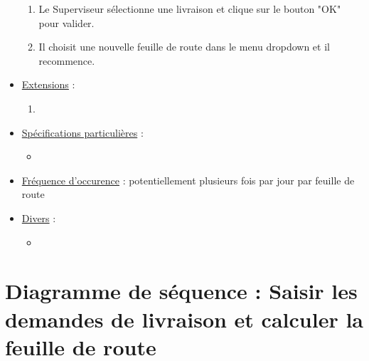 \documentclass[a4paper]{report}
\begin{document}
\begin{itemize}[label = \textbullet, font = \color{orange}]
\begin{enumerate}
        \item Le Superviseur sélectionne une livraison et clique sur le bouton "OK" pour valider.
        \item Il choisit une nouvelle feuille de route dans le menu dropdown et il recommence.
    \end{enumerate}
\item \underline{Extensions} :
	\begin{enumerate}
    	\item
    \end{enumerate}
\item \underline{Spécifications particulières} :
	\begin{itemize}[label = \textbullet, font = \color{blue}]
    \item
    \end{itemize}
\item \underline{Fréquence d'occurence} : potentiellement plusieurs fois par jour par feuille de route
\item \underline{Divers} :
\begin{itemize}[label = \textbullet, font = \color{blue}]
    \item
    \end{itemize}
\end{itemize}



\pagebreak

\section{Diagramme de séquence : Saisir les demandes de livraison et calculer
la feuille de route} ~~\\

\begin{sequencediagram}
\end{sequencediagram}
\end{document}

